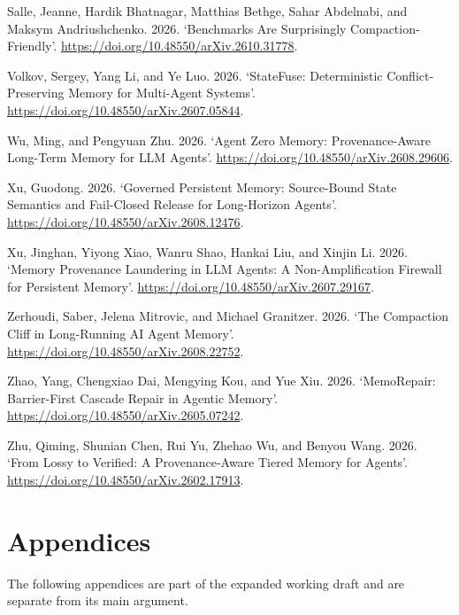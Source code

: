 \documentclass[
  11pt,
  a4paper,
]{article}
\newlength{\cslhangindent}
\newenvironment{CSLReferences}[2] %
 {\begin{list}{}{%
  \setlength{\itemindent}{0pt}
  \setlength{\leftmargin}{0pt}
  \setlength{\parsep}{0pt}
  \ifodd #1
   \setlength{\leftmargin}{\cslhangindent}
   \setlength{\itemindent}{-1\cslhangindent}
  \fi
  \setlength{\itemsep}{#2\baselineskip}}}
 {\end{list}}
\begin{document}
\begin{CSLReferences}{1}{0}
Salle, Jeanne, Hardik Bhatnagar, Matthias Bethge, Sahar Abdelnabi, and
Maksym Andriushchenko. 2026. {`Benchmarks Are Surprisingly
Compaction-Friendly'}. \url{https://doi.org/10.48550/arXiv.2610.31778}.

Volkov, Sergey, Yang Li, and Ye Luo. 2026. {`{StateFuse}: Deterministic
Conflict-Preserving Memory for Multi-Agent Systems'}.
\url{https://doi.org/10.48550/arXiv.2607.05844}.

Wu, Ming, and Pengyuan Zhu. 2026. {`Agent Zero Memory: Provenance-Aware
Long-Term Memory for {LLM} Agents'}.
\url{https://doi.org/10.48550/arXiv.2608.29606}.

Xu, Guodong. 2026. {`Governed Persistent Memory: Source-Bound State
Semantics and Fail-Closed Release for Long-Horizon Agents'}.
\url{https://doi.org/10.48550/arXiv.2608.12476}.

Xu, Jinghan, Yiyong Xiao, Wanru Shao, Hankai Liu, and Xinjin Li. 2026.
{`Memory Provenance Laundering in {LLM} Agents: A Non-Amplification
Firewall for Persistent Memory'}.
\url{https://doi.org/10.48550/arXiv.2607.29167}.

Zerhoudi, Saber, Jelena Mitrovic, and Michael Granitzer. 2026. {`The
Compaction Cliff in Long-Running {AI} Agent Memory'}.
\url{https://doi.org/10.48550/arXiv.2608.22752}.

Zhao, Yang, Chengxiao Dai, Mengying Kou, and Yue Xiu. 2026.
{`{MemoRepair}: Barrier-First Cascade Repair in Agentic Memory'}.
\url{https://doi.org/10.48550/arXiv.2605.07242}.

Zhu, Qiming, Shunian Chen, Rui Yu, Zhehao Wu, and Benyou Wang. 2026.
{`From Lossy to Verified: A Provenance-Aware Tiered Memory for Agents'}.
\url{https://doi.org/10.48550/arXiv.2602.17913}.

\end{CSLReferences}

\clearpage

\section{Appendices}\label{appendices}

The following appendices are part of the expanded working draft and are
separate from its main argument.
\end{document}
